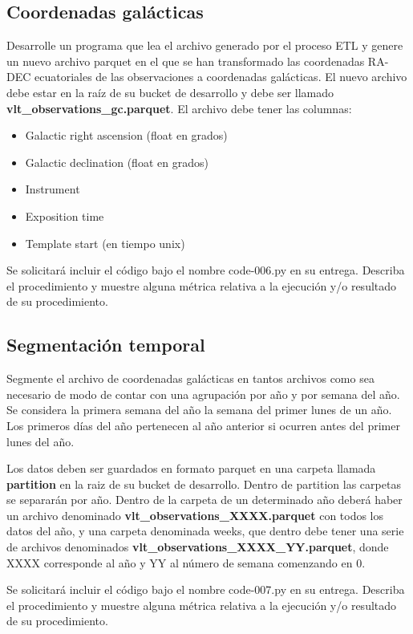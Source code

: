 \documentclass[12pt,letterpaper,twoside]{article}
\begin{document}
\begin{code}[H]
    
\end{code}

\subsection{Coordenadas galácticas}

{\color{red} Desarrolle un programa que lea el archivo generado por el proceso ETL y genere un nuevo archivo parquet en el que se han transformado las coordenadas RA-DEC ecuatoriales de las observaciones a coordenadas galácticas. El nuevo archivo debe estar en la raíz de su bucket de desarrollo y debe ser llamado \textbf{vlt\_observations\_gc.parquet}. El archivo debe tener las columnas:
    \begin{itemize}
        \item Galactic right ascension (float en grados)
        \item Galactic declination (float en grados)
        \item Instrument
        \item Exposition time
        \item Template start (en tiempo unix)
    \end{itemize}
    Se solicitará incluir el código bajo el nombre code-006.py en su entrega. Describa el procedimiento y muestre alguna métrica relativa a la ejecución y/o resultado de su procedimiento.}

\begin{code}[H]
    
\end{code}

\subsection{Segmentación temporal}

{\color{red} Segmente el archivo de coordenadas galácticas en tantos archivos como sea necesario de modo de contar con una agrupación por año y por semana del año. Se considera la primera semana del año la semana del primer lunes de un año. Los primeros días del año pertenecen al año anterior si ocurren antes del primer lunes del año.

    Los datos deben ser guardados en formato parquet en una carpeta llamada \textbf{partition} en la raiz de su bucket de desarrollo. Dentro de partition las carpetas se separarán por año. Dentro de la carpeta de un determinado año deberá haber un archivo denominado \textbf{vlt\_observations\_XXXX.parquet} con todos los datos del año, y una carpeta denominada weeks, que dentro debe tener una serie de archivos denominados \textbf{vlt\_observations\_XXXX\_YY.parquet}, donde XXXX corresponde al año y YY al número de semana comenzando en 0.

    Se solicitará incluir el código bajo el nombre code-007.py en su entrega. Describa el procedimiento y muestre alguna métrica relativa a la ejecución y/o resultado de su procedimiento.}
\end{document}
